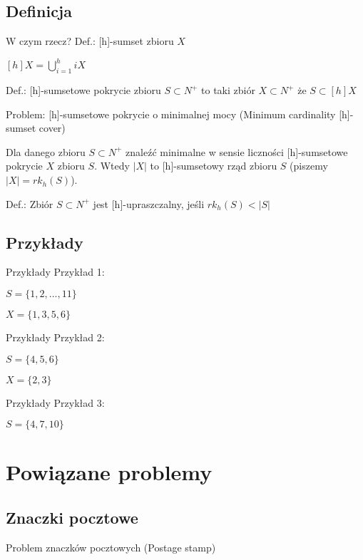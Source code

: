 \documentclass{beamer}
\begin{document}
	\subsection{Definicja}
		\begin{frame}{W czym rzecz?}
			Def.: [h]-sumset zbioru $ X $
			
			$ [h]X = \bigcup_{i=1}^{h} iX $
			
			Def.: [h]-sumsetowe pokrycie zbioru $ S \subset N^{+} $ to taki zbiór $ X \subset N^{+} $ że $ S \subset [h]X $
			
			Problem: [h]-sumsetowe pokrycie o minimalnej mocy (Minimum cardinality [h]-sumset cover)
			
			Dla danego zbioru $ S \subset N^{+} $ znaleźć minimalne w sensie liczności [h]-sumsetowe pokrycie $ X $ zbioru $ S $. Wtedy $ |X| $ to [h]-sumsetowy rząd zbioru $ S $ (piszemy $ |X| = rk_{h}(S) $).
			
			Def.: Zbiór $ S \subset N^{+} $ jest [h]-upraszczalny, jeśli $ rk_{h}(S) < |S| $
		\end{frame}
		
	\subsection{Przykłady}
		\begin{frame}{Przykłady}
			Przykład 1:
			
			$ S = \lbrace 1,2,...,11 \rbrace $
			
			$ X = \lbrace 1,3,5,6 \rbrace $
		\end{frame}
			
		\begin{frame}{Przykłady}
			Przykład 2:
			
			$ S = \lbrace 4,5,6 \rbrace $
			
			$ X = \lbrace 2,3 \rbrace $
		\end{frame}
		
		\begin{frame}{Przykłady}		
			Przykład 3:
			
			$ S =  \lbrace 4,7,10 \rbrace $						
		\end{frame}
		
\section{Powiązane problemy}
	\subsection{Znaczki pocztowe}
		\begin{frame}
			Problem znaczków pocztowych (Postage stamp)
		\end{frame}
		
\end{document}

